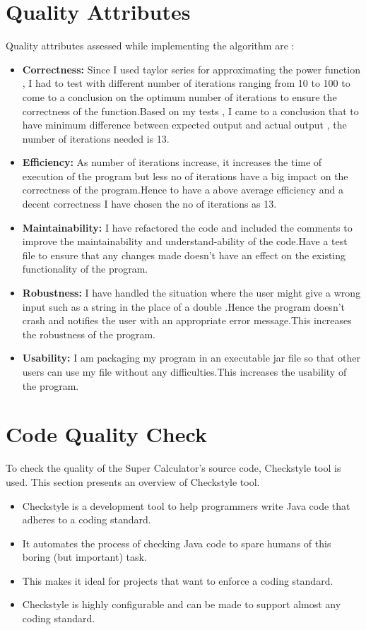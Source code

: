 \documentclass[a4paper, 11pt]{report}
\begin{document}
\section*{Quality Attributes}
Quality attributes assessed while implementing the algorithm  are :\\
\begin{itemize}
  \item \textbf{Correctness:} Since I used taylor series for approximating the power function , I had to test with different number of iterations ranging from 10 to 100 to come to a conclusion on the optimum number of iterations to ensure the correctness of the function.Based on my tests , I came to a conclusion that to have minimum difference between expected output and actual output , the number of iterations needed is 13.
  \item \textbf{Efficiency:} As number of iterations increase, it increases the time of execution of the program but less no of iterations have a big impact on the correctness of the program.Hence to have a above average efficiency and a decent correctness I have chosen the no of iterations as 13.
  \item \textbf{Maintainability:} I have refactored the code and included the comments to improve the maintainability and understand-ability of the code.Have a test file to ensure that any changes made doesn't have an effect on the existing functionality of the program.
  \item \textbf{Robustness:} I have handled the situation where the user might give a wrong input such as a string in the place of a double .Hence the program doesn't crash and notifies the user with an appropriate error message.This increases the robustness of the program.
  \item \textbf{Usability:} I am packaging my program in an executable jar file so that other users can use my file without any difficulties.This increases the usability of the program.
\end{itemize}

\section*{Code Quality Check}
To check the quality of the Super Calculator's source code, Checkstyle tool is used. This section presents an overview of Checkstyle tool.
\begin{itemize}
    \item Checkstyle is a development tool to help programmers write Java code that adheres to a coding standard.
    \item It automates the process of checking Java code to spare humans of this boring (but important) task.
    \item This makes it ideal for projects that want to enforce a coding standard.
    \item Checkstyle is highly configurable and can be made to support almost any coding standard.
\end{itemize}

\newpage
\end{document}
